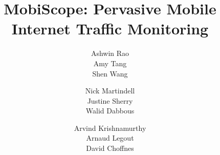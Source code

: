 \documentclass{sig-alternate-10pt}
\title{MobiScope: Pervasive Mobile Internet Traffic Monitoring}
\author{
\alignauthor
Ashwin Rao\\
\affaddr{INRIA}
\alignauthor
Amy Tang\\
\affaddr{UC Berkeley}
\alignauthor        
Shen Wang\\
\affaddr{University of Washington}
\and
\alignauthor
Nick Martindell\\
\affaddr{University of Washington}
\alignauthor
Justine Sherry\\
\affaddr{UC Berkeley}
\alignauthor
Walid Dabbous\\
\affaddr{INRIA}
\and
\alignauthor
Arvind Krishnamurthy\\
\affaddr{University of Washington}
\alignauthor 
Arnaud Legout\\
\affaddr{INRIA}
\alignauthor
David Choffnes\\
\affaddr{Northeastern University}
}
\date{}
\begin{document}
	
\maketitle











%









%
%
{\footnotesize


}
\end{document}
